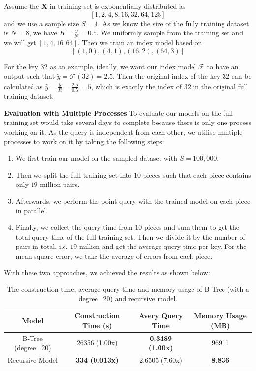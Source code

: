 \begin{mscexample}
	\label{mscexample:sampled_training}
	Assume the \textbf{X} in training set is exponentially distributed as $$[1,2,4,8,16,32,64,128]$$ and we use a sample size $S=4$. As we know the size of the fully training dataset is $N=8$, we have $R=\frac{S}{N}=0.5$. We uniformly sample from the training set and we will get $[1,4,16,64]$. Then we train an index model based on $$[(1,0), (4,1), (16,2), (64,3)]$$ 
	
	For the key $32$ as an example, ideally, we want our index model $\mathcal{F}$ to have an output such that $\tilde{y}=\mathcal{F}(32)=2.5$. Then the original index of the key $32$ can be calculated as $\hat{y}=\frac{\tilde{y}}{R}=\frac{2.5}{0.5}=5$, which is exactly the index of $32$ in the original full training dataset.
\end{mscexample}


\textbf{Evaluation with Multiple Processes} To evaluate our models on the full training set would take several days to complete because there is only one process working on it. As the query is independent from each other, we utilise multiple processes to work on it by taking the following steps:

\begin{enumerate}
	\item We first train our model on the sampled dataset with $S=100,000$.
	\item Then we split the full training set into $10$ pieces such that each piece contains only $19$ million pairs.
	\item Afterwards, we perform the point query with the trained model on each piece in parallel.
	\item Finally, we collect the query time from $10$ pieces and sum them to get the total query time of the full training set. Then we divide it by the number of pairs in total, i.e. $19$ million and get the average query time per key. For the mean square error, we take the average of errors from each piece.
\end{enumerate}

With these two approaches, we achieved the results as shown below:

\begin{table}[h!]
\centering
\begin{tabular}{ | c | c| c | c | }
\hline
Model & Construction Time (s) & Avery Query Time & Memory Usage (MB)\\ 
\hline
B-Tree (degree=20) & 26356 (1.00x) & \textbf{0.3489 (1.00x)} & 96911\\ 
\hline
Recursive Model & \textbf{334 (0.013x)} & 2.6505 (7.60x) & \textbf{8.836} \\ 
\hline
\end{tabular}
\caption{The construction time, average query time and memory usage of B-Tree (with a degree=20) and recursive model.}
\label{exp3}
\end{table}


